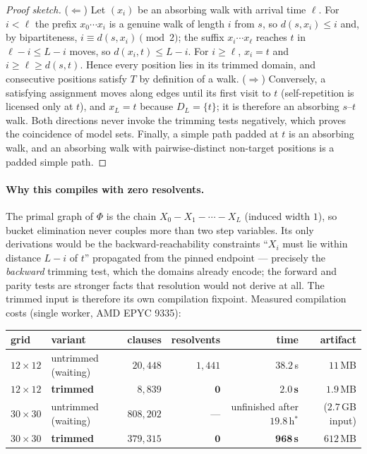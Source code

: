 \begin{proof}[Proof sketch]
($\Leftarrow$) Let $(x_i)$ be an absorbing walk with arrival time
$\ell$. For $i<\ell$ the prefix $x_0\cdots x_i$ is a genuine walk of
length $i$ from $s$, so $d(s,x_i)\le i$ and, by bipartiteness,
$i\equiv d(s,x_i) \pmod 2$; the suffix $x_i\cdots x_\ell$ reaches $t$ in
$\ell-i\le L-i$ moves, so $d(x_i,t)\le L-i$. For $i\ge\ell$, $x_i=t$ and
$i \ge \ell \ge d(s,t)$. Hence every position lies in its trimmed
domain, and consecutive positions satisfy $T$ by definition of a walk.
($\Rightarrow$) Conversely, a satisfying assignment moves along edges
until its first visit to $t$ (self-repetition is licensed only at $t$),
and $x_L=t$ because $D_L=\{t\}$; it is therefore an absorbing $s$--$t$
walk. Both directions never invoke the trimming tests negatively, which
proves the coincidence of model sets. Finally, a simple path padded at
$t$ is an absorbing walk, and an absorbing walk with pairwise-distinct
non-target positions is a padded simple path.
\end{proof}

\paragraph{Why this compiles with zero resolvents.}
The primal graph of $\Phi$ is the chain
$X_0 - X_1 - \cdots - X_L$ (induced width $1$), so bucket elimination
never couples more than two step variables. Its only derivations would
be the backward-reachability constraints
``$X_i$ must lie within distance $L-i$ of $t$'' propagated from the
pinned endpoint — precisely the \emph{backward} trimming test, which the
domains already encode; the forward and parity tests are stronger facts
that resolution would not derive at all. The trimmed input is therefore
its own compilation fixpoint. Measured compilation costs (single
worker, AMD EPYC 9335):

\begin{center}
\begin{tabular}{llrrrr}
\hline
grid & variant & clauses & resolvents & time & artifact \\
\hline
$12\times 12$ & untrimmed (waiting) & $20{,}448$ & $1{,}441$ & $38.2$\,s & $11$\,MB \\
$12\times 12$ & \textbf{trimmed}    & $8{,}839$  & $\mathbf{0}$ & $\mathbf{2.0}$\,\textbf{s} & $1.9$\,MB \\
$30\times 30$ & untrimmed (waiting) & $808{,}202$ & --- & unfinished after $19.8$\,h$^{*}$ & ($2.7$\,GB input) \\
$30\times 30$ & \textbf{trimmed}    & $379{,}315$ & $\mathbf{0}$ & $\mathbf{968}$\,\textbf{s} & $612$\,MB \\
\hline
\end{tabular}
\end{center}

